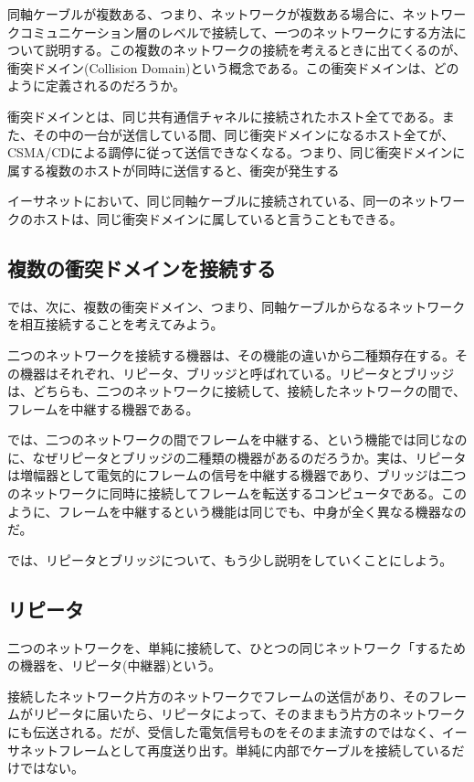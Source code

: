 同軸ケーブルが複数ある、つまり、ネットワークが複数ある場合に、ネットワークコミュニケーション層のレベルで接続して、一つのネットワークにする方法について説明する。この複数のネットワークの接続を考えるときに出てくるのが、衝突ドメイン(Collision Domain)という概念である。この衝突ドメインは、どのように定義されるのだろうか。

衝突ドメインとは、同じ共有通信チャネルに接続されたホスト全てである。また、その中の一台が送信している間、同じ衝突ドメインになるホスト全てが、CSMA/CDによる調停に従って送信できなくなる。つまり、同じ衝突ドメインに属する複数のホストが同時に送信すると、衝突が発生する

イーサネットにおいて、同じ同軸ケーブルに接続されている、同一のネットワークのホストは、同じ衝突ドメインに属していると言うこともできる。

\subsection{複数の衝突ドメインを接続する}




では、次に、複数の衝突ドメイン、つまり、同軸ケーブルからなるネットワークを相互接続することを考えてみよう。

二つのネットワークを接続する機器は、その機能の違いから二種類存在する。その機器はそれぞれ、リピータ、ブリッジと呼ばれている。リピータとブリッジは、どちらも、二つのネットワークに接続して、接続したネットワークの間で、フレームを中継する機器である。

では、二つのネットワークの間でフレームを中継する、という機能では同じなのに、なぜリピータとブリッジの二種類の機器があるのだろうか。実は、リピータは増幅器として電気的にフレームの信号を中継する機器であり、ブリッジは二つのネットワークに同時に接続してフレームを転送するコンピュータである。このように、フレームを中継するという機能は同じでも、中身が全く異なる機器なのだ。

では、リピータとブリッジについて、もう少し説明をしていくことにしよう。

\subsection{リピータ}

二つのネットワークを、単純に接続して、ひとつの同じネットワーク「するための機器を、リピータ(中継器)という。

接続したネットワーク片方のネットワークでフレームの送信があり、そのフレームがリピータに届いたら、リピータによって、そのままもう片方のネットワークにも伝送される。だが、受信した電気信号ものをそのまま流すのではなく、イーサネットフレームとして再度送り出す。単純に内部でケーブルを接続しているだけではない。

